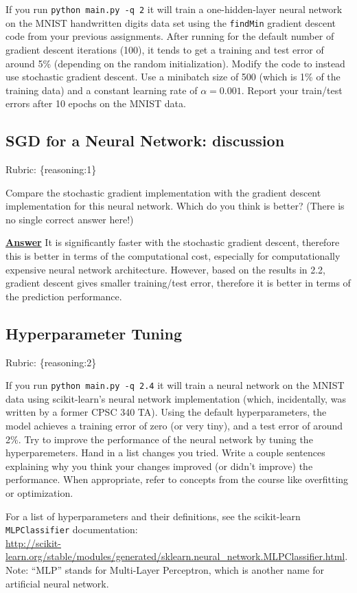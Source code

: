 \documentclass{article}
\def\rubric#1{\gre{Rubric: \{#1\}}}{}
\def\blu#1{{\color{blu}#1}}
\def\gre#1{{\color{gre}#1}}
\begin{document}
If you run \texttt{python main.py -q 2} it will train a one-hidden-layer neural network on the MNIST handwritten digits data set using the \texttt{findMin} gradient descent code from your previous assignments. After running for the default number of gradient descent iterations (100), it tends to get a training and test error of around 5\% (depending on the random initialization). 
\blu{Modify the code to instead use stochastic gradient descent. Use a minibatch size of 500 (which is 1\% of the training data) and a constant learning rate of $\alpha=0.001$. Report your train/test errors after 10 epochs on the MNIST data.} 

\subsection{SGD for a Neural Network: discussion}
\rubric{reasoning:1}

Compare the stochastic gradient implementation with the gradient descent implementation for this neural network. Which do you think is better? (There is no single correct answer here!) 

\underline{\textbf{Answer}}
It is significantly faster with the stochastic gradient descent, therefore this is better in terms of the computational cost, especially for computationally expensive neural network architecture. However, based on the results in 2.2, gradient descent gives smaller training/test error, therefore it is better in terms of the prediction performance.


\subsection{Hyperparameter Tuning}
\rubric{reasoning:2}

If you run \texttt{python main.py -q 2.4} it will train a neural network on the MNIST data using scikit-learn's neural network implementation (which, incidentally, was written by a former CPSC 340 TA).
Using the default hyperparameters, the model achieves a training error of zero (or very tiny), and a test error of around 2\%. 
Try to improve the performance of the neural network by tuning the hyperparemeters.
\blu{Hand in a list changes you tried. Write a couple sentences explaining why you think your changes improved (or didn't improve) the performance. When appropriate, refer to concepts from the course like overfitting or optimization.}

For a list of hyperparameters and their definitions, see the scikit-learn \texttt{MLPClassifier} documentation:\\
\url{http://scikit-learn.org/stable/modules/generated/sklearn.neural_network.MLPClassifier.html}. Note: ``MLP'' stands for Multi-Layer Perceptron,
which is another name for artificial neural network.
\end{document}
